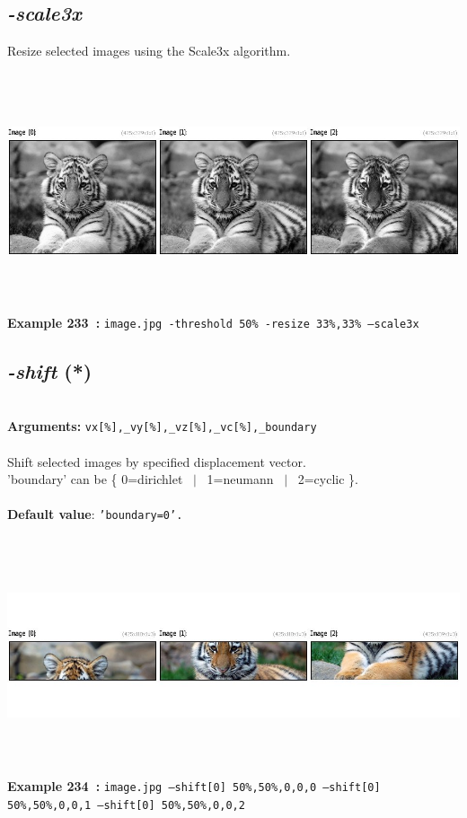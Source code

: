 \documentclass[a4paper,11pt,twoside]{book}
\begin{document}
\subsection{\emph{-scale3x} }\vspace*{-0.5em}
Resize selected images using the Scale3x algorithm.
\begin{center}\includegraphics[keepaspectratio=true,height=7cm,width=\textwidth]{img/gmic_def233.jpg}\\
{\footnotesize \textbf{Example 233~:} \texttt{image.jpg -threshold 50\% -resize 33\%,33\% --scale3x}}
\end{center}

\subsection{\emph{-shift} (*)}\vspace*{-0.5em}
~\\\textbf{Arguments: } 
{\small \texttt{vx[\%],\_vy[\%],\_vz[\%],\_vc[\%],\_boundary}}\\~\\
Shift selected images by specified displacement vector.
~\\'boundary' can be \{ 0=dirichlet ~$|$~ 1=neumann ~$|$~ 2=cyclic \}.
~\\~\\\textbf{Default value}: {\small \texttt{'boundary=0'.}}
\begin{center}\includegraphics[keepaspectratio=true,height=7cm,width=\textwidth]{img/gmic_def234.jpg}\\
{\footnotesize \textbf{Example 234~:} \texttt{image.jpg --shift[0] 50\%,50\%,0,0,0 --shift[0] 50\%,50\%,0,0,1 --shift[0] 50\%,50\%,0,0,2}}
\end{center}
\end{document}
